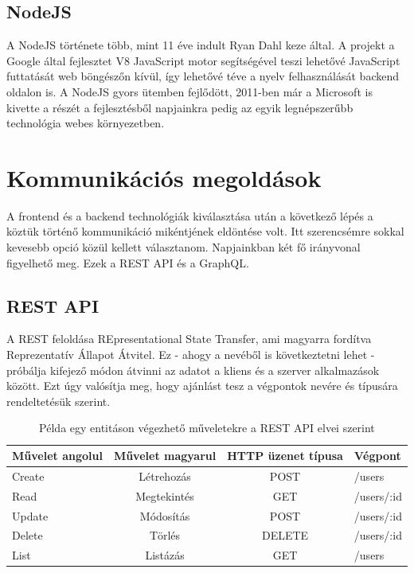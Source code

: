 \subsection{NodeJS}
A NodeJS története több, mint 11 éve indult Ryan Dahl keze által. A projekt a Google által fejlesztet V8 JavaScript motor segítségével teszi lehetővé JavaScript futtatását web böngészőn kívül, így lehetővé téve a nyelv felhasználását backend oldalon is. A NodeJS gyors ütemben fejlődött, 2011-ben már a Microsoft is kivette a részét a fejlesztésből napjainkra pedig az egyik legnépszerűbb technológia webes környezetben.

\section{Kommunikációs megoldások}

A frontend és a backend technológiák kiválasztása után a következő lépés a köztük történő kommunikáció mikéntjének eldöntése volt.
Itt szerencsémre sokkal kevesebb opció közül kellett választanom. Napjainkban két fő irányvonal figyelhető meg. Ezek a REST API és a GraphQL.

\subsection{REST API}
A REST feloldása REpresentational State Transfer, ami magyarra fordítva Reprezentatív Állapot Átvitel. Ez - ahogy a nevéből is következtetni lehet - próbálja kifejező módon átvinni az adatot a kliens és a szerver alkalmazások között.
Ezt úgy valósítja meg, hogy ajánlást tesz a végpontok nevére és típusára rendeltetésük szerint.

\begin{table}[ht]
	\footnotesize
	\centering
	\begin{tabular}{ l c c l }
		\toprule
		Művelet angolul & Művelet magyarul & HTTP üzenet típusa & Végpont \\
		\midrule
		Create & Létrehozás & POST & /users \\
		Read & Megtekintés & GET & /users/:id \\
		Update & Módosítás  & POST & /users/:id \\
		Delete & Törlés  &  DELETE & /users/:id \\
		List & Listázás  & GET & /users \\
		\bottomrule
	\end{tabular}
	\caption{Példa egy entitáson végezhető műveletekre a REST API elvei szerint}
	\label{tab:RESTTable}
\end{table}


